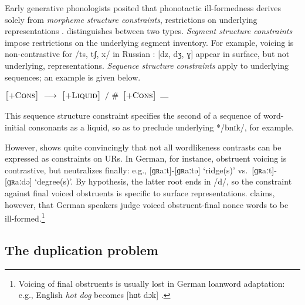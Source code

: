 Early generative phonologists posited that phonotactic ill-formedness derives solely from \emph{morpheme structure constraints}, restrictions on underlying representations \citep{Chomsky1965,SPE,SPR,Halle1962}.
\citet{Stanley1967} distinguishes between two types.
\emph{Segment structure constraints} impose restrictions on the underlying segment inventory.
For example, voicing is non-contrastive for /ts, tʃ, x/ in Russian \cite[22]{SPR}: [dz, dʒ, ɣ] appear in surface, but not underlying, representations.
\emph{Sequence structure constraints} apply to underlying sequences; an example is given below.

\begin{example}
$\begin{bmatrix} +\textsc{Cons} \end{bmatrix}~\goesto~\begin{bmatrix} +\textsc{Liquid} \end{bmatrix}~/~\#~\begin{bmatrix} +\textsc{Cons} \end{bmatrix}~\gap$
\end{example}

\noindent
This sequence structure constraint specifies the second of a sequence of word-initial consonants as a liquid, so as to preclude underlying */bnɪk/, for example.

However, \citet{Shibatani1973} shows quite convincingly that not all wordlikeness contrasts can be expressed as constraints on URs.
In German, for instance, obstruent voicing is contrastive, but neutralizes finally: e.g., [ɡʀaːt]-[ɡʀaːtə] `ridge(s)' vs.~[ɡʀaːt]-[ɡʀaːdə] `degree(s)'.
By hypothesis, the latter root ends in /d/, so the constraint against final voiced obstruents is specific to surface representations.
\citeauthor{Shibatani1973} claims, however, that German speakers judge voiced obstruent-final nonce words to be ill-formed.\footnote{
    Voicing of final obstruents is usually lost in German loanword adaptation: e.g., English \emph{hot dog} becomes [hɑt dɔk] \citep[506]{Ussishkin2003}.}

\subsection{The duplication problem}
\label{ss:dp}

